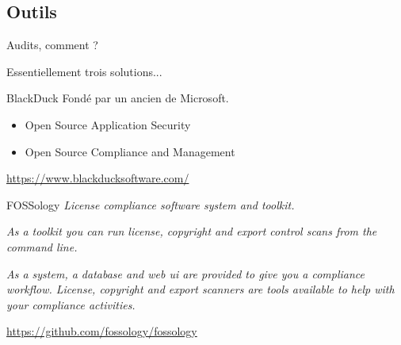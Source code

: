 \documentclass{beamer}
\begin{document}
\subsection{Outils}

\begin{frame}{Audits, comment ?}

Essentiellement trois solutions...

\end{frame}


\begin{frame}{BlackDuck}
  Fondé par un ancien de Microsoft.

  \begin{itemize}
  \item Open Source Application Security
  \item Open Source Compliance and Management
  \end{itemize}

\url{https://www.blackducksoftware.com/}
\end{frame}


\begin{frame}{FOSSology}
\textit{License compliance software system and toolkit.}

\textit{As a toolkit you can run license, copyright and export control scans from the command line.}

\textit{As a system, a database and web ui are provided to give you a compliance workflow. License, copyright and export scanners are tools available to help with your compliance activities.}

\url{https://github.com/fossology/fossology}

\end{frame}

\begin{frame}[plain]%
%  
\end{frame}
\end{document}
